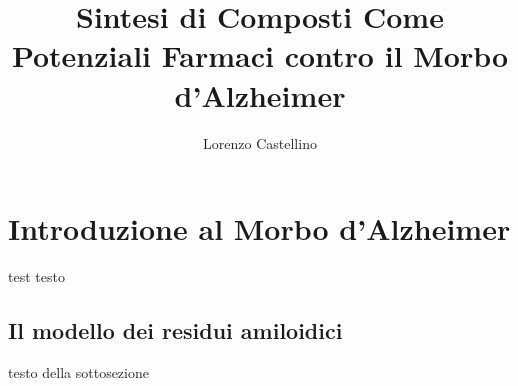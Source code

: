 \documentclass[a4paper, 12pt]{article}
\title{Sintesi di Composti Come Potenziali Farmaci contro il Morbo d'Alzheimer}
\author{Lorenzo Castellino}
\begin{document}
\maketitle
\newpage
\setcounter{page}{0}
\tableofcontents
\newpage
\section{Introduzione al Morbo d'Alzheimer}
test testo
\subsection{Il modello dei residui amiloidici}
testo della sottosezione
\newpage
\end{document}
